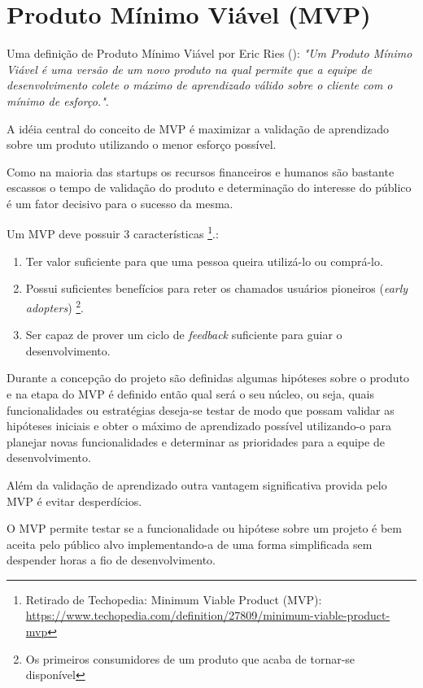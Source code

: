 \section{Produto Mínimo Viável (MVP)}
\par Uma definição de Produto Mínimo Viável por Eric Ries (\cite{ries:11}):
\emph{"Um Produto Mínimo Viável é uma versão de um novo produto na qual permite que a equipe de desenvolvimento colete o máximo de aprendizado válido sobre o cliente com o mínimo de esforço."}.
    \par A idéia central do conceito de MVP é maximizar a validação de aprendizado sobre um produto utilizando o menor esforço possível.
    \par Como na maioria das startups os recursos financeiros e humanos são bastante escassos o tempo de validação do produto e determinação do interesse do público é um fator decisivo para o sucesso da mesma.
    \par Um MVP deve possuir 3 características \footnote{ Retirado de Techopedia: Minimum Viable Product (MVP): \url{https://www.techopedia.com/definition/27809/minimum-viable-product-mvp}}.:
    \begin{enumerate}
        \item Ter valor suficiente para que uma pessoa queira utilizá-lo ou comprá-lo.
        \item Possui suficientes benefícios para reter os chamados usuários pioneiros (\emph{early adopters}) \footnote{Os primeiros consumidores de um produto que acaba de tornar-se disponível}.
        \item Ser capaz de prover um ciclo de \emph{feedback} suficiente para guiar o desenvolvimento.
\end{enumerate}
    \par Durante a concepção do projeto são definidas algumas hipóteses sobre o produto e na etapa do MVP é definido então qual será o seu núcleo, ou seja, quais funcionalidades ou estratégias deseja-se testar de modo que possam validar as hipóteses iniciais e obter o máximo de aprendizado possível utilizando-o para planejar novas funcionalidades e determinar as prioridades para a equipe de desenvolvimento.
    \par Além da validação de aprendizado outra vantagem significativa provida pelo MVP é evitar desperdícios.
    \par O MVP permite testar se a funcionalidade ou hipótese sobre um projeto é bem aceita pelo público alvo implementando-a de uma forma simplificada sem despender horas a fio de desenvolvimento.
